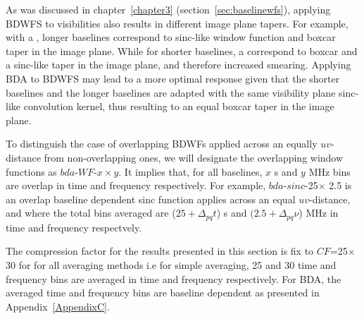 \documentclass[useAMS,usenatbib]{mn2e}
\begin{document}
% 
% 
% 
As was discussed in chapter~\ref{chapter3} (section~\ref{sec:baselinewfs}), applying BDWFS to visibilities 
also results in different image plane tapers. For example, with 
a , 
longer baselines correspond  to sinc-like window function and boxcar taper in the image plane. 
While  for shorter baselines, a  correspond to boxcar and a sinc-like taper in the image plane, and therefore increased
smearing. Applying BDA to BDWFS may lead to a more optimal response given that the shorter baselines and the longer
baselines are adapted with the same visibility plane sinc-like convolution kernel, 
thus resulting to an equal boxcar taper in the image plane.

To distinguish the case of overlapping BDWFs applied across an equally $uv$-distance from non-overlapping ones, 
we will designate the overlapping window functions  as $bda$-$WF$-$x \times y$. It implies that, for  all 
baselines, $x$ s and  $y$ MHz bins are overlap in time and frequency respectively. For example,
$bda$-$sinc$-25$\times$ 2.5 is an overlap baseline dependent sinc function applies across an equal $uv$-distance, and where 
the total bins averaged are ($25 + \Delta_{pq} t$) s and $(2.5 + \Delta_{pq} \nu$) MHz in time and frequency respectvely.

The compression factor for the results presented in this section is fix to $CF$=25$\times$30 for
for all averaging methods i.e for simple averaging, 25 and 30 time and frequency bins are averaged in time
and frequency respectively. For BDA, the averaged time and frequency bins are baseline dependent as presented
in Appendix~\ref{AppendixC}.
\end{document}

